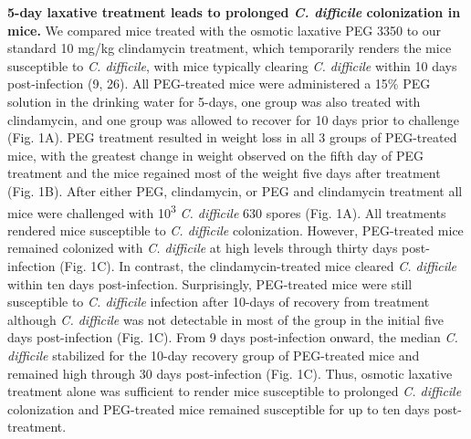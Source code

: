\documentclass[
  11pt,
]{article}
\begin{document}
\textbf{5-day laxative treatment leads to prolonged \emph{C. difficile}
colonization in mice.} We compared mice treated with the osmotic
laxative PEG 3350 to our standard 10 mg/kg clindamycin treatment, which
temporarily renders the mice susceptible to \emph{C. difficile}, with
mice typically clearing \emph{C. difficile} within 10 days
post-infection (9, 26). All PEG-treated mice were administered a 15\%
PEG solution in the drinking water for 5-days, one group was also
treated with clindamycin, and one group was allowed to recover for 10
days prior to challenge (Fig. 1A). PEG treatment resulted in weight loss
in all 3 groups of PEG-treated mice, with the greatest change in weight
observed on the fifth day of PEG treatment and the mice regained most of
the weight five days after treatment (Fig. 1B). After either PEG,
clindamycin, or PEG and clindamycin treatment all mice were challenged
with 10\textsuperscript{3} \emph{C. difficile} 630 spores (Fig. 1A). All
treatments rendered mice susceptible to \emph{C. difficile}
colonization. However, PEG-treated mice remained colonized with \emph{C.
difficile} at high levels through thirty days post-infection (Fig. 1C).
In contrast, the clindamycin-treated mice cleared \emph{C. difficile}
within ten days post-infection. Surprisingly, PEG-treated mice were
still susceptible to \emph{C. difficile} infection after 10-days of
recovery from treatment although \emph{C. difficile} was not detectable
in most of the group in the initial five days post-infection (Fig. 1C).
From 9 days post-infection onward, the median \emph{C. difficile}
stabilized for the 10-day recovery group of PEG-treated mice and
remained high through 30 days post-infection (Fig. 1C). Thus, osmotic
laxative treatment alone was sufficient to render mice susceptible to
prolonged \emph{C. difficile} colonization and PEG-treated mice remained
susceptible for up to ten days post-treatment.
\end{document}
